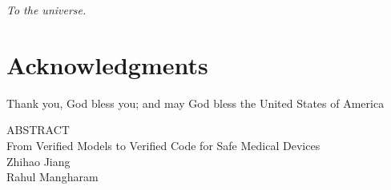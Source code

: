 \documentclass[12pt,letterpaper]{report}
\theoremstyle{definition}
\theoremstyle{remark}
\numberwithin{equation}{chapter}
\theoremstyle{plain} %
\def\thetitle{From Verified Models to Verified Code for Safe Medical Devices}
\begin{document}
\newpage
\begin{center}
\vspace*{\fill}
\it{To the universe.}
\vspace*{\fill}
\end{center}


\newpage
{}
{}
\chapter*{Acknowledgments}
%
Thank you, God bless you; and may God bless the United States of America




\newpage
{}
{}
\begin{center}
ABSTRACT\\
$ $\\
\thetitle\\
$ $\\
Zhihao Jiang\\
Rahul Mangharam\\
\end{center}

\noindent 




 



\newpage
{}
\tableofcontents
\clearpage
{}
{}
\listoftables
\clearpage
{}
{}
\listoffigures




\newpage
{}








%
%
%
%
%
%
%
\end{document}
